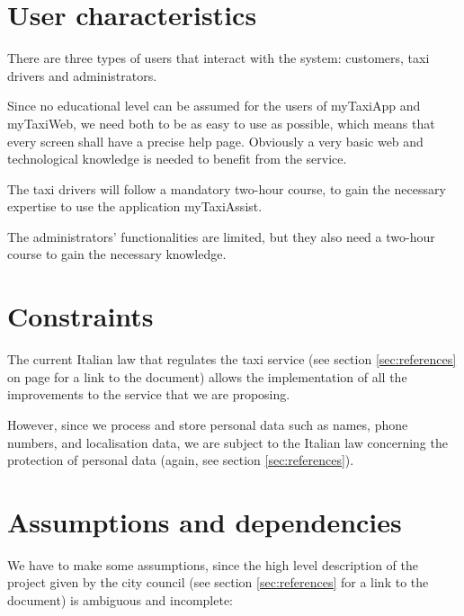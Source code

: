 \section{User characteristics}
There are three types of users that interact with the system: customers, taxi drivers and administrators. 

Since no educational level can be assumed for the users of myTaxiApp and myTaxiWeb, we need both to be as easy to use as possible, which means that every screen shall have a precise help page. Obviously a very basic web and technological knowledge is needed to benefit from the service.

The taxi drivers will follow a mandatory two-hour course, to gain the necessary expertise to use the application myTaxiAssist. 

The administrators' functionalities are limited, but they also need a two-hour course to gain the necessary knowledge.


\section{Constraints}  
The current Italian law that regulates the taxi service (see section \ref{sec:references} on page \pageref{sec:references} for a link to the document) allows the implementation of all the improvements to the service that we are proposing. 

However, since we process and store personal data such as names, phone numbers, and localisation data, we are subject to the Italian law concerning the protection of personal data (again, see section \ref{sec:references}).


\section{Assumptions and dependencies}
We have to make some assumptions, since the high level description of the project given by the city council (see section \ref{sec:references} for a link to the document) is ambiguous and incomplete:

